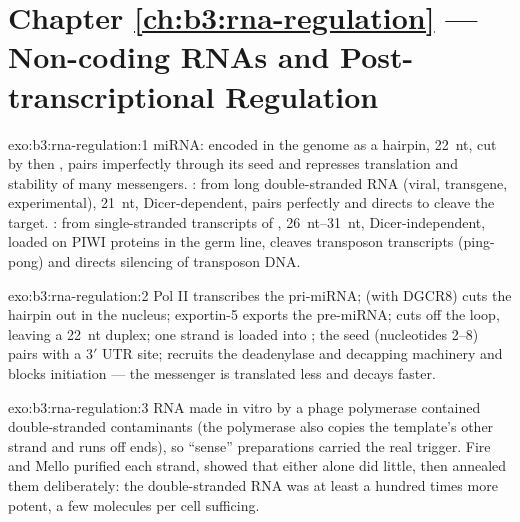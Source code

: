 \section*{Chapter \ref{ch:b3:rna-regulation} --- Non-coding RNAs and Post-transcriptional Regulation}

\begin{solution}{exo:b3:rna-regulation:1}
miRNA: encoded in the genome as a hairpin, \qty{22}{nt}, cut by 
then , pairs imperfectly through its seed and represses
translation and stability of many messengers. : from long
double-stranded RNA (viral, transgene, experimental), \qty{21}{nt},
Dicer-dependent, pairs perfectly and directs  to cleave the
target. : from single-stranded transcripts of ,
\qtyrange{26}{31}{nt}, Dicer-independent, loaded on PIWI proteins in
the germ line, cleaves transposon transcripts (ping-pong) and directs
 silencing of transposon DNA.
\end{solution}

\begin{solution}{exo:b3:rna-regulation:2}
Pol II transcribes the pri-miRNA;  (with DGCR8) cuts the hairpin
out in the nucleus; exportin-5 exports the pre-miRNA;  cuts off the
loop, leaving a \qty{22}{nt} duplex; one strand is loaded into
; the seed (nucleotides 2--8) pairs with a 3$'$ UTR site;
 recruits the deadenylase and decapping machinery and blocks
initiation --- the messenger is translated less and decays faster.
\end{solution}

\begin{solution}{exo:b3:rna-regulation:3}
RNA made in vitro by a phage polymerase contained double-stranded
contaminants (the polymerase also copies the template's other strand
and runs off ends), so ``sense'' preparations carried the real
trigger. Fire and Mello purified each strand, showed that either alone
did little, then annealed them deliberately: the double-stranded RNA
was at least a hundred times more potent, a few molecules per cell
sufficing.
\end{solution}

